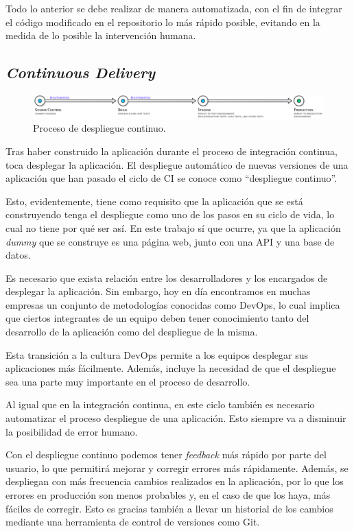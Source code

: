 Todo lo anterior se debe realizar de manera automatizada, con el fin de integrar el código modificado en el repositorio lo más rápido posible, evitando en la medida de lo posible la intervención humana.

\subsection*{\textit{Continuous Delivery}}

\begin{figure}
  \centerline{\includegraphics[width=17cm]{figuras/cd}}
  \caption{Proceso de despliegue continuo.\cite{img:cd}}
  \label{fig:cd}
\end{figure}

Tras haber construido la aplicación durante el proceso de integración continua, toca desplegar la aplicación. El despliegue automático de nuevas versiones de una aplicación que han pasado el ciclo de CI se conoce como ``despliegue continuo''.

Esto, evidentemente, tiene como requisito que la aplicación que se está construyendo tenga el despliegue como uno de los pasos en su ciclo de vida, lo cual no tiene por qué ser así. En este trabajo sí que ocurre, ya que la aplicación \textit{dummy} que se construye es una página web, junto con una API y una base de datos.

Es necesario que exista relación entre los desarrolladores y los encargados de desplegar la aplicación. Sin embargo, hoy en día encontramos en muchas empresas un conjunto de metodologías conocidas como DevOps\cite{devops}, lo cual implica que ciertos integrantes de un equipo deben tener conocimiento tanto del desarrollo de la aplicación como del despliegue de la misma.

Esta transición a la cultura DevOps permite a los equipos desplegar sus aplicaciones más fácilmente. Además, incluye la necesidad de que el despliegue sea una parte muy importante en el proceso de desarrollo.

Al igual que en la integración continua, en este ciclo también es necesario automatizar el proceso despliegue de una aplicación. Esto siempre va a disminuir la posibilidad de error humano.

Con el despliegue continuo podemos tener \textit{feedback} más rápido por parte del usuario, lo que permitirá mejorar y corregir errores más rápidamente. Además, se despliegan con más frecuencia cambios realizados en la aplicación, por lo que los errores en producción son menos probables y, en el caso de que los haya, más fáciles de corregir. Esto es gracias también a llevar un historial de los cambios mediante una herramienta de control de versiones como Git.

